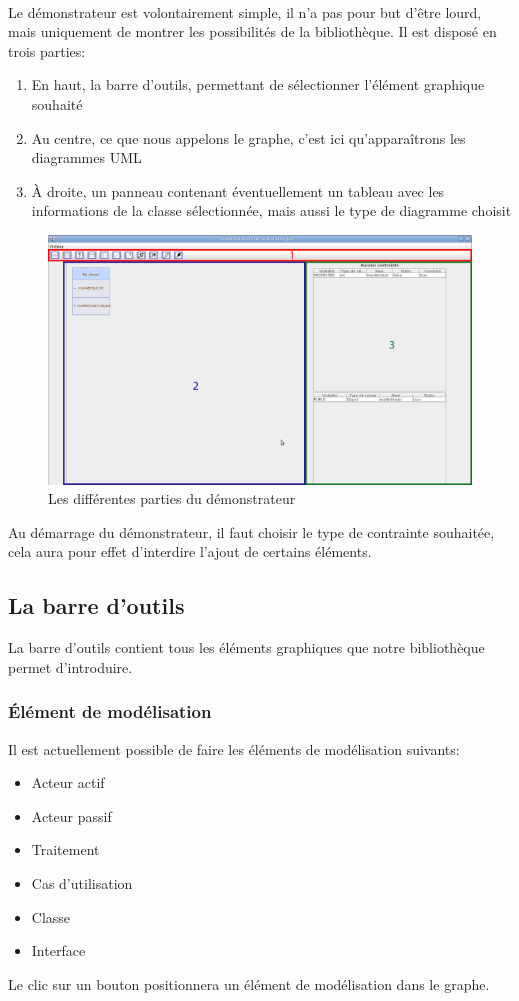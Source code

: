 \documentclass[12pt,a4paper,oneside]{book}
\begin{document}
	\paragraph{}	
	Le démonstrateur est volontairement simple, il n'a pas pour but d'être lourd, mais uniquement de montrer les possibilités de la bibliothèque. 
	Il est disposé en trois parties:
	\begin{enumerate}
		\item En haut, la barre d'outils, permettant de sélectionner l'élément graphique souhaité
		\item Au centre, ce que nous appelons le graphe, c'est ici qu'apparaîtrons les diagrammes UML
		\item À droite, un panneau contenant éventuellement un tableau avec les informations de la classe sélectionnée, mais aussi le type de diagramme choisit
	\end{enumerate}
	\begin{figure}[H]
		\centering
		\includegraphics[width=15cm]{screen1.jpg}
		\caption{Les différentes parties du démonstrateur}
	\end{figure}
	Au démarrage du démonstrateur, il faut choisir le type de contrainte souhaitée, cela aura pour effet d'interdire l'ajout de certains éléments.
	\subsection{La barre d'outils}
	La barre d'outils contient tous les éléments graphiques que notre bibliothèque permet d'introduire.
	\subsubsection{Élément de modélisation}
	Il est actuellement possible de faire les éléments de modélisation suivants:
	\begin{itemize}
		\item Acteur actif
		\item Acteur passif
		\item Traitement
		\item Cas d'utilisation
		\item Classe
		\item Interface
	\end{itemize}
	Le clic sur un bouton positionnera un élément de modélisation dans le graphe.
\end{document}
